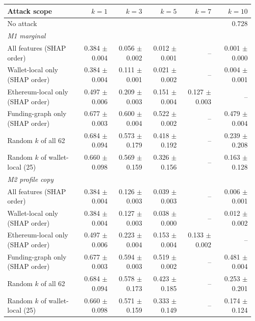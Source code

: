 \begin{tabular}{lrrrrr}
\toprule
Attack scope & $k=1$ & $k=3$ & $k=5$ & $k=7$ & $k=10$ \\
\midrule
No attack & \multicolumn{5}{r}{0.728} \\
\midrule
\multicolumn{6}{l}{\emph{M1 marginal}} \\
All features (SHAP order) & 0.384 $\pm$ 0.004 & 0.056 $\pm$ 0.002 & 0.012 $\pm$ 0.001 & -- & 0.001 $\pm$ 0.000 \\
Wallet-local only (SHAP order) & 0.384 $\pm$ 0.004 & 0.111 $\pm$ 0.001 & 0.021 $\pm$ 0.002 & -- & 0.004 $\pm$ 0.001 \\
Ethereum-local only (SHAP order) & 0.497 $\pm$ 0.006 & 0.209 $\pm$ 0.003 & 0.151 $\pm$ 0.004 & 0.127 $\pm$ 0.003 & -- \\
Funding-graph only (SHAP order) & 0.677 $\pm$ 0.003 & 0.600 $\pm$ 0.004 & 0.522 $\pm$ 0.002 & -- & 0.479 $\pm$ 0.004 \\
Random $k$ of all 62 & 0.684 $\pm$ 0.094 & 0.573 $\pm$ 0.179 & 0.418 $\pm$ 0.192 & -- & 0.239 $\pm$ 0.208 \\
Random $k$ of wallet-local (25) & 0.660 $\pm$ 0.098 & 0.569 $\pm$ 0.159 & 0.326 $\pm$ 0.156 & -- & 0.163 $\pm$ 0.128 \\
\midrule
\multicolumn{6}{l}{\emph{M2 profile copy}} \\
All features (SHAP order) & 0.384 $\pm$ 0.004 & 0.126 $\pm$ 0.003 & 0.039 $\pm$ 0.003 & -- & 0.006 $\pm$ 0.001 \\
Wallet-local only (SHAP order) & 0.384 $\pm$ 0.004 & 0.127 $\pm$ 0.003 & 0.038 $\pm$ 0.000 & -- & 0.012 $\pm$ 0.002 \\
Ethereum-local only (SHAP order) & 0.497 $\pm$ 0.006 & 0.223 $\pm$ 0.004 & 0.153 $\pm$ 0.004 & 0.133 $\pm$ 0.002 & -- \\
Funding-graph only (SHAP order) & 0.677 $\pm$ 0.003 & 0.594 $\pm$ 0.003 & 0.519 $\pm$ 0.002 & -- & 0.481 $\pm$ 0.004 \\
Random $k$ of all 62 & 0.684 $\pm$ 0.094 & 0.578 $\pm$ 0.173 & 0.423 $\pm$ 0.185 & -- & 0.253 $\pm$ 0.201 \\
Random $k$ of wallet-local (25) & 0.660 $\pm$ 0.098 & 0.571 $\pm$ 0.159 & 0.333 $\pm$ 0.149 & -- & 0.174 $\pm$ 0.124 \\
\bottomrule
\end{tabular}

